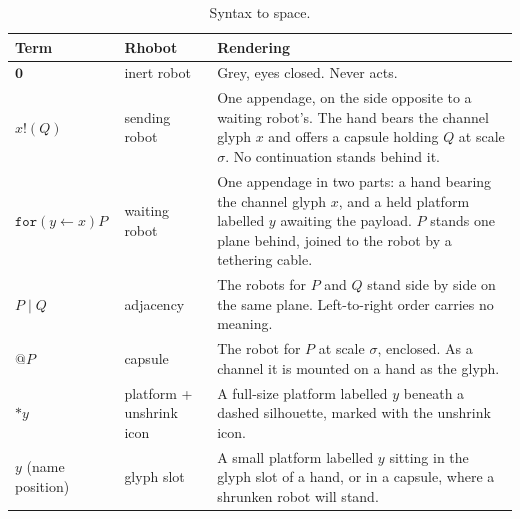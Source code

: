 \documentclass[11pt]{article}
\makeatletter
\newcommand{\rhonil}{\mathbf{0}}
\newcommand{\recv}[3]{\mathtt{for}(#1 \leftarrow #2)#3}
\newcommand{\send}[2]{#1!(#2)}
\newcommand{\quot}[1]{@#1}
\newcommand{\drop}[1]{{*}#1}
\makeatother
\begin{document}
\begin{table}[h]
\centering\small
\begin{tabularx}{\linewidth}{@{}l l X@{}}
\toprule
Term & Rhobot & Rendering\\
\midrule
$\rhonil$ & inert robot & Grey, eyes closed. Never acts.\\
$\send{x}{Q}$ & sending robot & One appendage, on the side opposite to a waiting robot's. The hand
  bears the channel glyph $x$ and offers a capsule holding $Q$ at scale $\sigma$. No continuation
  stands behind it.\\
$\recv{y}{x}{P}$ & waiting robot & One appendage in two parts: a hand bearing the channel glyph
  $x$, and a held platform labelled $y$ awaiting the payload. $P$ stands one plane behind,
  joined to the robot by a tethering cable.\\
$P \mid Q$ & adjacency & The robots for $P$ and $Q$ stand side by side on the same plane.
  Left-to-right order carries no meaning.\\
$\quot{P}$ & capsule & The robot for $P$ at scale $\sigma$, enclosed. As a channel it is
  mounted on a hand as the glyph.\\
$\drop{y}$ & platform + unshrink icon & A full-size platform labelled $y$ beneath a dashed
  silhouette, marked with the unshrink icon.\\
$y$ (name position) & glyph slot & A small platform labelled $y$ sitting in the glyph slot of a
  hand, or in a capsule, where a shrunken robot will stand.\\
\bottomrule
\end{tabularx}
\caption{Syntax to space.}
\label{tab:vocab}
\end{table}
\end{document}
